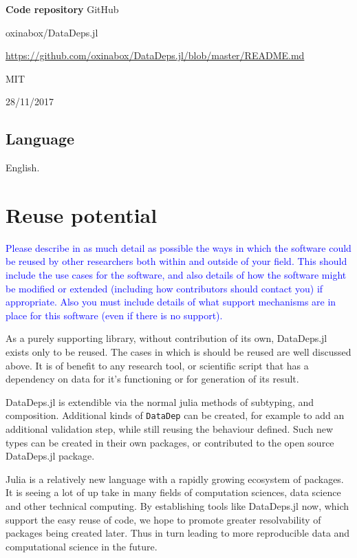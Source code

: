 \documentclass{jors}
\begin{document}
{\bf Code repository} GitHub

\begin{description}[noitemsep,topsep=0pt]
	\item[Name:] oxinabox/DataDeps.jl
	\item[Persistent identifier:] \url{https://github.com/oxinabox/DataDeps.jl/blob/master/README.md}
	\item[Licence:] MIT
	\item[Date published:] 28/11/2017
\end{description}


\subsection{Language}
English.

\section{Reuse potential}
\textcolor{blue}{Please describe in as much detail as possible the ways in which the software could be reused by other researchers both within and outside of your field. This should include the use cases for the software, and also details of how the software might be modified or extended (including how contributors should contact you) if appropriate. Also you must include details of what support mechanisms are in place for this software (even if there is no support).}

As a purely supporting library, without contribution of its own, DataDeps.jl exists only to be reused.
The cases in which is should be reused are well discussed above.
It is of benefit to any research tool, or scientific script that has a dependency on data for it's functioning or for generation of its result.


DataDeps.jl is extendible via the normal julia methods of subtyping, and composition.
Additional kinds of \texttt{DataDep} can be created, for example to add an additional validation step,
while still reusing the behaviour defined.
Such new types can be created in their own packages, or contributed to the open source DataDeps.jl package.


Julia is a relatively new language with a rapidly growing ecosystem of packages.
It is seeing a lot of up take in many fields of computation sciences, data science and other technical computing.
By establishing tools like DataDeps.jl now, which support the easy reuse of code,
we hope to promote greater resolvability of packages being created later.
Thus in turn leading to more reproducible data and computational science in the future.
\end{document}
